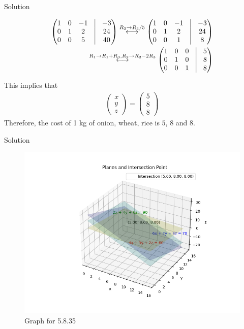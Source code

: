 \documentclass{beamer}
\theoremstyle{remark}
\newcommand{\myvec}[1]{\ensuremath{\begin{pmatrix}#1\end{pmatrix}}}
\begin{document}
\begin{frame}{Solution}

\begin{align}
    \myvec{1 & 0 & -1 & \vrule & -3 \\ 0 &  1& 2 & \vrule & 24\\ 0 & 0 & 5& \vrule & 40}
    \overset{R_3 \rightarrow R_3/5}{\longleftrightarrow} \myvec{1 & 0 & -1 & \vrule & -3 \\ 0 &  1& 2 & \vrule & 24\\ 0 & 0 & 1& \vrule & 8}\\ \overset{R_1 \rightarrow R_1 + R_3, R_2 \rightarrow R_2 - 2R_3}{\longleftrightarrow}\myvec{1 & 0 & 0 & \vrule & 5 \\ 0 &  1& 0 & \vrule & 8\\ 0 & 0 & 1& \vrule & 8}
\end{align}

This implies that 
\begin{align}
    \myvec{x \\ y\\ z}=\myvec{5 \\ 8 \\ 8}
\end{align}
Therefore, the cost of 1 kg of onion, wheat, rice is \rupee $5$, \rupee $8$ and \rupee $8$.
\end{frame}
\begin{frame}{Solution}
    \begin{figure}[H]
        \centering
        \includegraphics[width=0.7\columnwidth]{figs/1.png}
        \caption{Graph for 5.8.35}
        \label{fig:placeholder}
    \end{figure}
\end{frame}
\end{document}
